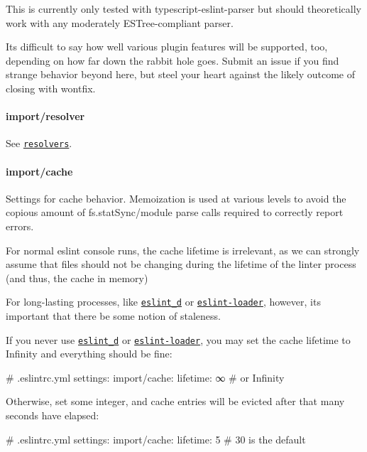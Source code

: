 This is currently only tested with {\ttfamily typescript-\/eslint-\/parser} but should theoretically work with any moderately E\+S\+Tree-\/compliant parser.

It\textquotesingle{}s difficult to say how well various plugin features will be supported, too, depending on how far down the rabbit hole goes. Submit an issue if you find strange behavior beyond here, but steel your heart against the likely outcome of closing with {\ttfamily wontfix}.

\paragraph*{{\ttfamily import/resolver}}

See \href{#resolvers}{\tt resolvers}.

\paragraph*{{\ttfamily import/cache}}

Settings for cache behavior. Memoization is used at various levels to avoid the copious amount of {\ttfamily fs.\+stat\+Sync}/module parse calls required to correctly report errors.

For normal {\ttfamily eslint} console runs, the cache lifetime is irrelevant, as we can strongly assume that files should not be changing during the lifetime of the linter process (and thus, the cache in memory)

For long-\/lasting processes, like \href{https://www.npmjs.com/package/eslint_d}{\tt {\ttfamily eslint\+\_\+d}} or \href{https://www.npmjs.com/package/eslint-loader}{\tt {\ttfamily eslint-\/loader}}, however, it\textquotesingle{}s important that there be some notion of staleness.

If you never use \href{https://www.npmjs.com/package/eslint_d}{\tt {\ttfamily eslint\+\_\+d}} or \href{https://www.npmjs.com/package/eslint-loader}{\tt {\ttfamily eslint-\/loader}}, you may set the cache lifetime to {\ttfamily Infinity} and everything should be fine\+:


\begin{DoxyCode}
# .eslintrc.yml
settings:
  import/cache:
    lifetime: ∞  # or Infinity
\end{DoxyCode}


Otherwise, set some integer, and cache entries will be evicted after that many seconds have elapsed\+:


\begin{DoxyCode}
# .eslintrc.yml
settings:
  import/cache:
    lifetime: 5  # 30 is the default
\end{DoxyCode}


